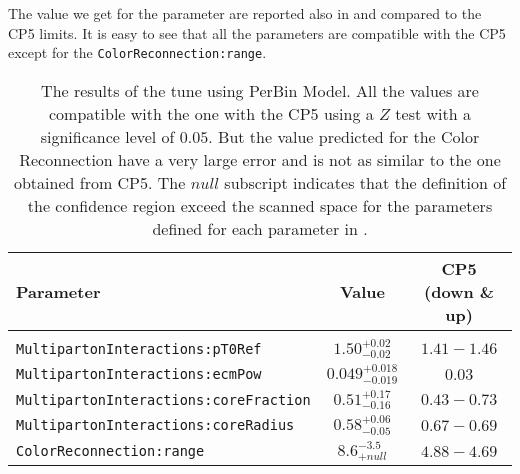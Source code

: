 \noindent The value we get for the parameter are reported also in  and compared to the CP5 limits. 
It is easy to see that all the parameters are compatible with the CP5 except for the \texttt{ColorReconnection:range}. 
\begin{table}[!htb]
\centering
	\begin{tabular}{l | c | c}
		Parameter & Value & CP5 (down \& up)\\ \hline\hline
		\\[-0.85em]		
\texttt{MultipartonInteractions:pT0Ref} & $ 1.50^{+0.02}_{-0.02}$ & $1.41 - 1.46$\\[3pt]
\texttt{MultipartonInteractions:ecmPow} & $ 0.049_{-0.019}^{+0.018} $ & $0.03$\\[3pt]
\texttt{MultipartonInteractions:coreFraction} & $ 0.51_{-0.16}^{+0.17} $ & $0.43 - 0.73$\\[3pt]
\texttt{MultipartonInteractions:coreRadius} & $ 0.58_{-0.05}^{+0.06} $ & $0.67 - 0.69$\\[3pt]
\texttt{ColorReconnection:range} & $ 8.6 ^{-3.5}_{+null} $ & $4.88 - 4.69$\\[2pt]
\end{tabular}
\caption{The results of the tune using PerBin Model. All the values are compatible with the one with the CP5 using a $Z$ test with a significance level of $0.05$. But the value predicted for the Color Reconnection have a very large error and is not as similar to the one obtained from CP5. The $null$ subscript indicates that the definition of the confidence region exceed the scanned space for the parameters defined for each parameter in .}
\label{table:result_PerBin_5params}
\end{table}

